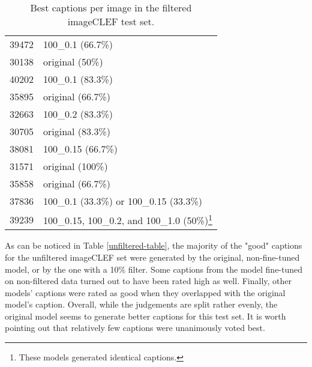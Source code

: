 \documentclass[11pt]{article}
\begin{document}
\begin{table}[h]
\begin{center}
\begin{tabular}{|p{1cm}|p{4.5cm}|}
            39472            & 100\_0.1 (66.7\%)                                                                             \\
            30138            & original (50\%)                                                                               \\
            40202            & 100\_0.1 (83.3\%)                                                                             \\
            35895            & original (66.7\%)                                                                             \\
            32663            & 100\_0.2 (83.3\%)                                                                             \\
            30705            & original (83.3\%)                                                                             \\
            38081            & 100\_0.15 (66.7\%)                                                                            \\
            31571            & original (100\%)                                                                              \\
            35858            & original (66.7\%)                                                                             \\
            37836            & 100\_0.1 (33.3\%) or 100\_0.15 (33.3\%)                                                       \\
            39239            & 100\_0.15, 100\_0.2, and 100\_1.0 (50\%)\footnote{These models generated identical captions.} \\
            \hline
        \end{tabular}
    \end{center}
    \caption{\label{filtered-table} Best captions per image in the filtered imageCLEF test set. }
\end{table}

As can be noticed in Table \ref{unfiltered-table}, the majority of the "good" captions for the unfiltered imageCLEF set were generated by the original, non-fine-tuned model, or by the one with a 10\% filter. Some captions from the model fine-tuned on non-filtered data turned out to have been rated high as well. Finally, other models' captions were rated as good when they overlapped with the original model's caption. Overall, while the judgements are split rather evenly, the original model seems to generate better captions for this test set. It is worth pointing out that relatively few captions were unanimously voted best.
\end{document}
